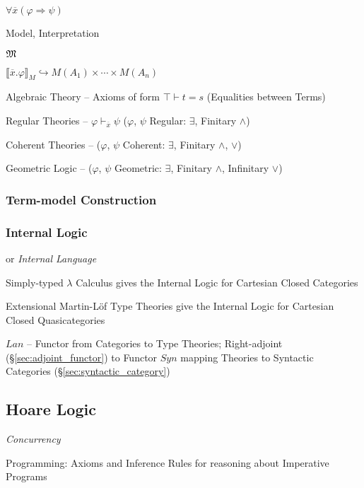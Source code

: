 $\forall \overline{x} (\varphi \Rightarrow \psi)$

Model, Interpretation

$\mathfrak{M}$

$\llbracket \overline{x}.\varphi \rrbracket_M \hookrightarrow M(A_1)
\times \cdots \times M(A_n)$


Algebraic Theory -- Axioms of form $\top \vdash t = s$ (Equalities
between Terms)

Regular Theories -- $\varphi \vdash_{\overline{x}} \psi$ ($\varphi$,
$\psi$ Regular: $\exists$, Finitary $\wedge$)

Coherent Theories -- ($\varphi$, $\psi$ Coherent: $\exists$, Finitary
$\wedge$, $\vee$)

Geometric Logic -- ($\varphi$, $\psi$ Geometric: $\exists$, Finitary
$\wedge$, Infinitary $\vee$)




\subsubsection{Term-model Construction}\label{sec:term_model}

\subsubsection{Internal Logic}\label{sec:internal_logic}

or \emph{Internal Language}

Simply-typed $\lambda$ Calculus gives the Internal Logic for
Cartesian Closed Categories

Extensional Martin-L\"of Type Theories give the Internal Logic for
Cartesian Closed Quasicategories

$Lan$ -- Functor from Categories to Type Theories; Right-adjoint
(\S\ref{sec:adjoint_functor}) to Functor $Syn$ mapping Theories to
Syntactic Categories (\S\ref{sec:syntactic_category})



\subsection{Hoare Logic}\label{sec:hoare_logic}

\emph{Concurrency}

Programming: Axioms and Inference Rules for reasoning about Imperative
Programs

